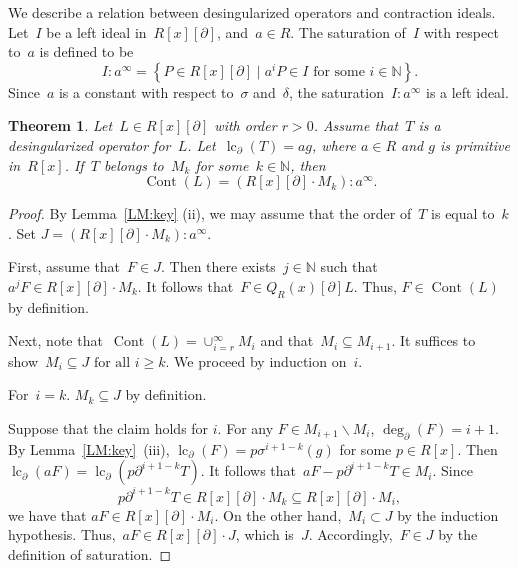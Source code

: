 \documentclass{sig-alternate}
\newcommand{\bN} { {\mathbb{N}}}
\newcommand{\cont}{\operatorname{Cont}}
\newcommand{\lc}{\operatorname{lc}}
\newcommand{\si} { {\sigma}}
\newcommand{\pa}{\partial}
\newtheorem{theorem}{Theorem}[section]
\begin{document}
We describe a relation between desingularized operators and contraction ideals.
Let~$I$ be a left ideal in~$R[x][\pa]$, and~$a \in R$. The saturation of~$I$ with respect to~$a$ is
defined to be
\[ I : a^\infty = \left\{ P \in R[x][\pa] \mid a^i P \in I \,\, \text{for some~$i \in \bN$} \right\}. \]
Since~$a$ is a constant with respect to~$\sigma$ and~$\delta$, the saturation~$I : a^\infty$ is a left ideal.

\begin{theorem}\label{TH:dc}
Let~$L \in R[x][\pa]$ with order $r>0$. Assume that~$T$ is a desingularized operator for~$L$.
Let~$\lc_{\pa}(T) {=} a g$, where $a \in R$ and $g$ is primitive in~$R[x]$.
If~$T$ belongs to~$M_k$ for some~$k \in \bN$,
then
$$\cont(L) = ( R[x][\pa] \cdot M_k ) : a^{\infty}.$$
\end{theorem}
\begin{proof} By Lemma~\ref{LM:key} (ii), we may assume that the order of~$T$ is equal to~$k$.
Set $J = ( R[x][\pa] \cdot M_k ) : a^{\infty}$.

First, assume that~$F \in J$. Then there exists~$j \in \bN$
such that $a^j F \in R[x][\pa] \cdot M_k$. It follows that~$F \in Q_{R}(x)[\pa] L$.
Thus, $F \in \cont(L)$ by definition.

Next, note that~$\cont(L) = \cup_{i = r}^{\infty} M_i$ and that~$M_i \subseteq M_{i + 1}$.
It suffices to show~$M_i \subseteq J \text{ for all } i \geq k$.
We proceed by induction on~$i$.

For~$i = k$. $M_k \subseteq J$ by definition.

Suppose that the claim holds for $i$. For any $F \in M_{i + 1} \backslash M_{i}$,
 $\deg_{\pa}(F) = i + 1$.
By Lemma~\ref{LM:key}~(iii), $\lc_{\pa}(F) = p \si^{i + 1 - k}(g)$
for some $p \in R[x]$. Then~$\lc_{\pa}(a F) = \lc_{\pa}(p \pa^{i + 1 - k} T)$.
It follows that~$a F - p \pa^{i + 1 - k} T \in M_{i}$.
Since
$$p \pa^{i + 1 - k} T \in R[x][\pa] \cdot M_k \subseteq R[x][\pa] \cdot M_i,$$
 we have that
$a F \in R[x][\pa] \cdot M_i$. On the other hand,~$M_i {\subset} J$ by the induction hypothesis.
Thus,~$a F \in R[x][\pa] \cdot J$, which is~$J$. Accordingly,~$F \in J$ by the definition
of saturation.
\end{proof}
\end{document}
